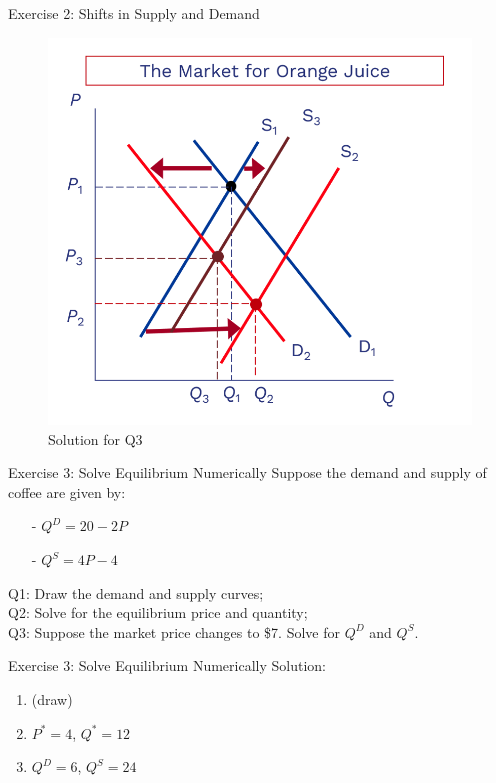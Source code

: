 \documentclass[9pt, handout]{beamer}
\begin{document}
\begin{frame}{Exercise 2: Shifts in Supply and Demand}
    \begin{figure}
        \centering
        \includegraphics[width=0.5\linewidth]{fig3.png}
        \caption{Solution for Q3}
    \end{figure}
\end{frame}

\begin{frame}{Exercise 3: Solve Equilibrium Numerically}
    Suppose the demand and supply of coffee are given by:
    \begin{itemize}
        \item[-] $Q^D=20 - 2P$ 
        \item[-] $Q^S = 4P - 4$
    \end{itemize}
    Q1: Draw the demand and supply curves;\\
    Q2: Solve for the equilibrium price and quantity;\\
    Q3: Suppose the market price changes to \$7. Solve for $Q^D$ and $Q^S$.
    \vspace{2in}
\end{frame}

\begin{frame}{Exercise 3: Solve Equilibrium Numerically}
    Solution:
    \begin{enumerate}
        \item (draw)
        \item $P^*=4$, $Q^*=12$
        \item $Q^D=6$, $Q^S=24$
    \end{enumerate}
\end{frame}
\end{document}
